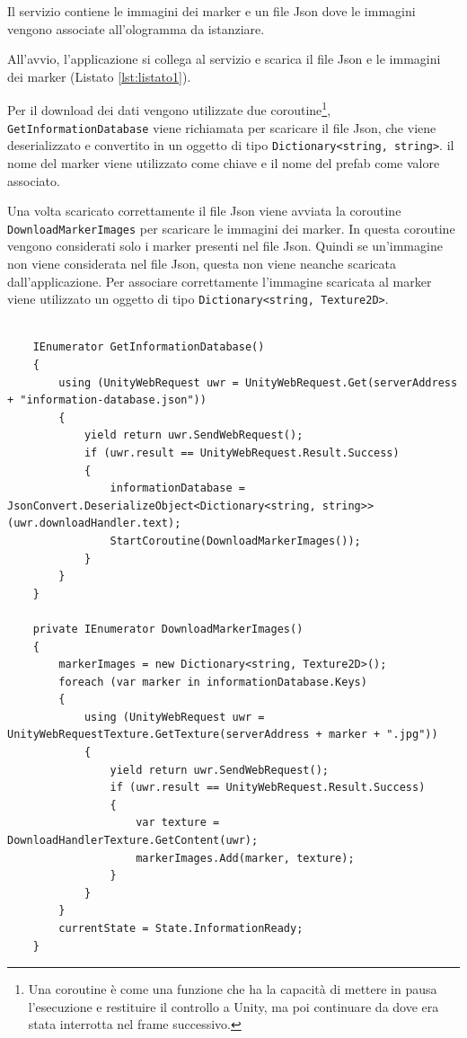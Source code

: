 Il servizio contiene le immagini dei marker e un file Json dove le immagini vengono associate all'ologramma da istanziare.

All'avvio, l'applicazione si collega al servizio e scarica il file Json e le immagini dei marker (Listato \ref{lst:listato1}).

Per il download dei dati vengono utilizzate due coroutine\footnote{Una coroutine è come una funzione che ha la capacità di mettere in pausa l'esecuzione e restituire il controllo a Unity, ma poi continuare da dove era stata interrotta nel frame successivo.}, \texttt{GetInformationDatabase} viene richiamata per scaricare il file Json, che viene deserializzato e convertito in un oggetto di tipo \texttt{Dictionary<string, string>}. il nome del marker viene utilizzato come chiave e il nome del prefab come valore associato.

Una volta scaricato correttamente il file Json viene avviata la coroutine \texttt{DownloadMarkerImages} per scaricare le immagini dei marker.
In questa coroutine vengono considerati solo i marker presenti nel file Json. Quindi se un'immagine non viene considerata nel file Json, questa non viene neanche scaricata dall'applicazione.
Per associare correttamente l'immagine scaricata al marker viene utilizzato un oggetto di tipo \texttt{Dictionary<string, Texture2D>}.

\lstset{language=[Sharp]C, numbers=left}
\begin{lstlisting}[caption={coroutine utilizzate per scaricare il file Json e le immagini dei marker dal servizio.}, label=lst:listato1]

    IEnumerator GetInformationDatabase()
    {
        using (UnityWebRequest uwr = UnityWebRequest.Get(serverAddress + "information-database.json"))
        {
            yield return uwr.SendWebRequest();
            if (uwr.result == UnityWebRequest.Result.Success)
            {
                informationDatabase = JsonConvert.DeserializeObject<Dictionary<string, string>>(uwr.downloadHandler.text);
                StartCoroutine(DownloadMarkerImages());
            }
        }
    }

    private IEnumerator DownloadMarkerImages()
    {
        markerImages = new Dictionary<string, Texture2D>();
        foreach (var marker in informationDatabase.Keys)
        {
            using (UnityWebRequest uwr = UnityWebRequestTexture.GetTexture(serverAddress + marker + ".jpg"))
            {
                yield return uwr.SendWebRequest();
                if (uwr.result == UnityWebRequest.Result.Success)
                {
                    var texture = DownloadHandlerTexture.GetContent(uwr);
                    markerImages.Add(marker, texture);
                }
            }
        }
        currentState = State.InformationReady;
    }
\end{lstlisting}

